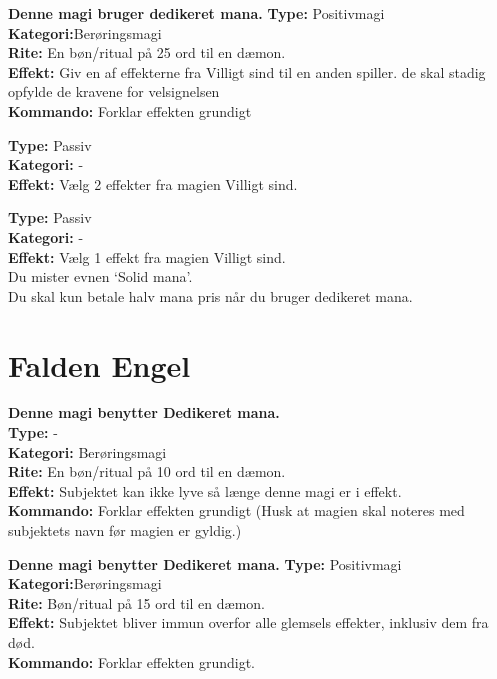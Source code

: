 \begin{korruption*}
\textbf{Denne magi bruger dedikeret mana.}
\textbf{Type:} Positivmagi\\
\textbf{Kategori:}Berøringsmagi\\
\textbf{Rite:} En bøn/ritual på 25 ord til en dæmon.\\
\textbf{Effekt:} Giv en af effekterne fra Villigt sind til en anden spiller. de skal stadig opfylde de kravene for velsignelsen\\
\textbf{Kommando:} Forklar effekten grundigt
\end{korruption*}

\begin{korruption*}
\textbf{Type:} Passiv\\
\textbf{Kategori:} -\\
\textbf{Effekt:} Vælg 2 effekter fra magien Villigt sind.
\end{korruption*}

\begin{korruption*}
\textbf{Type:} Passiv\\
\textbf{Kategori:} -\\
\textbf{Effekt:} Vælg 1 effekt fra magien Villigt sind.\\
Du mister evnen ‘Solid mana’.\\ 
Du skal kun betale halv mana pris når du bruger dedikeret mana.
\end{korruption*}

\section*{Falden Engel}

\begin{falden*}
\textbf{Denne magi benytter Dedikeret mana.}\\
\textbf{Type:} - \\
\textbf{Kategori:} Berøringsmagi\\
\textbf{Rite:} En bøn/ritual på 10 ord til en dæmon.\\
\textbf{Effekt:} Subjektet kan ikke lyve så længe denne magi er i effekt.\\
\textbf{Kommando:} Forklar effekten grundigt (Husk at magien skal noteres med subjektets navn før magien er gyldig.)
\end{falden*}

\begin{falden*}
\textbf{Denne magi benytter Dedikeret mana.}
\textbf{Type:} Positivmagi\\
\textbf{Kategori:}Berøringsmagi\\
\textbf{Rite:} Bøn/ritual på 15 ord til en dæmon.\\
\textbf{Effekt:} Subjektet bliver immun overfor alle glemsels effekter, inklusiv dem fra død.\\
\textbf{Kommando:} Forklar effekten grundigt.
\end{falden*}

